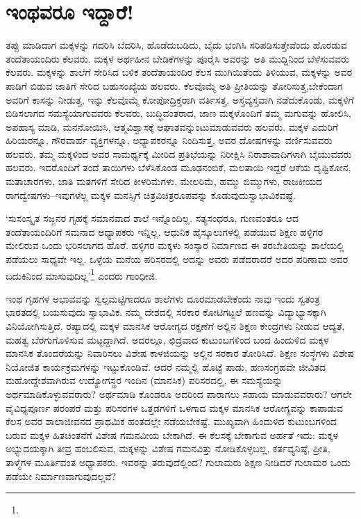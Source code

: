\section*{ಇಂಥವರೂ ಇದ್ದಾರೆ!}


ತಪ್ಪು ಮಾಡಿದಾಗ ಮಕ್ಕಳನ್ನು ಗದರಿಸಿ ಬೆದರಿಸಿ, ಹೊಡೆದುಬಡಿದು, ಬೈದು ಭಂಗಿಸಿ ಸರಿಪಡಿಸುತ್ತೇವೆಂದು ಹೊರಡುವ ತಂದೆತಾಯಂದಿರು ಕೆಲವರು. ಮಕ್ಕಳ ಅರ್ಥಹೀನ ಬೇಡಿಕೆಗಳನ್ನು ಪೂರೈಸಿ ಅವರನ್ನು ಅತಿ ಮುದ್ದಿನಿಂದ ಬೆಳೆಸುವವರು ಕೆಲವರು. ಮಕ್ಕಳನ್ನು ಶಾಲೆಗೆ ಸೇರಿಸಿದ ಬಳಿಕ ತಂದೆತಾಯಂದಿರ ಕೆಲಸ ಮುಗಿಯಿತೆಂದು ತಿಳಿಯುವ, ಮಕ್ಕಳನ್ನು ಅವರ ಪಾಡಿಗೆ ಬಿಡುವ ಜಾತಿಗೆ ಸೇರಿದ ಬಹುಸಂಖ್ಯೆಯ ಹಲವರು. ಕೆಲವೊಮ್ಮೆ ಅತಿ ಪ್ರೀತಿಯನ್ನು ತೋರಿಸುತ್ತ,\break ಬೇಕೆಂದಾಗ ಅವರಿಗೆ ಕಾಸನ್ನು ನೀಡುತ್ತ, ಇನ್ನು ಕೆಲವೊಮ್ಮೆ ಕೋಪೋದ್ರಿಕ್ತರಾಗಿ ವರ್ತಿಸತ್ತ, ಅಸ್ತವ್ಯಸ್ತವಾಗಿ ನಡೆದುಕೊಂಡು, ಮಕ್ಕಳಿಗೆ ಬಿಡಿಸಲಾಗದ ಸಮಸ್ಯೆಯಾಗುವವರು ಕೆಲವರು, ಬುದ್ಧಿವಂತರಾದ, ಜಾಣ ಮಕ್ಕಳೊಂದಿಗೆ ತಮ್ಮ ಮಗುವನ್ನು ಹೋಲಿಸಿ, ಅಪಹಾಸ್ಯ ಮಾಡಿ, ಮನನೋಯಿಸಿ, ಆತ್ಮವಿಶ್ವಾಸಕ್ಕೆ ಆಘಾತವನ್ನುಂಟುಮಾಡುವವರು ಹಲವರು. ಮಕ್ಕಳ ಎದುರಿಗೆ ಹಿರಿಯರನ್ನೂ, ಗೌರವಾರ್ಹ ವ್ಯಕ್ತಿಗಳನ್ನೂ, ಅಧ್ಯಾಪಕರನ್ನೂ ನಿಂದಿಸುತ್ತ, ಅವರ ದೋಷಗಳನ್ನು ವರ್ಣಿಸುವವರು ಹಲವರು. ತಮ್ಮ ಮಕ್ಕಳಿಂದ ಅವರ ಸಾಮರ್ಥ್ಯಕ್ಕೆ ಮೀರಿದ ಪ್ರತಿಭೆಯನ್ನು ನಿರೀಕ್ಷಿಸಿ ನಿರಾಶಾವಾದಿಗಳಾಗಿ ಬೈಯುವವರು ಹಲವರು. ಇದರೊಂದಿಗೆ ತಂದೆ ತಾಯಿಗಳು ಬೆಳೆಸಿಕೊಂಡ ಮೂಢನಂಬಿಕೆ, ಮಲತಾಯಿ ಇದ್ದರೆ ಆಕೆಯ ದೃಷ್ಟಿಕೋನ, ಮತಾಚಾರಗಳು, ಜಾತಿ ಮತಗಳಿಗೆ ಸೇರಿದ ಕೀಳರಿಮೆಗಳು, ಮೇಲರಿಮೆ, ಹಮ್ಮು ಬಿಮ್ಮುಗಳು, ರಾಜಕೀಯದ ರಾಗದ್ವೇಷಗಳು–ಇವುಗಳೆಲ್ಲ ಮಕ್ಕಳ ಮನಸ್ಸಿಗೆ ಚಿತ್ರವಿಚಿತ್ರರೂಪವನ್ನು ಕೊಡುವುದು\break ಸ್ವಾಭಾವಿಕವಷ್ಟೆ.

‘ಸುಸಂಸ್ಕೃತ ಸಜ್ಜನರ ಗೃಹಕ್ಕೆ ಸಮಾನವಾದ ಶಾಲೆ ಇನ್ನೊಂದಿಲ್ಲ. ಸತ್ಯಸಂಧರೂ, ಗುಣ\-ವಂತರೂ ಆದ ತಂದೆತಾಯಂದಿರಿಗೆ ಸಮನಾದ ಅಧ್ಯಾಪಕರು ಇನ್ನಿಲ್ಲ. ಆಧುನಿಕ ಹೈಸ್ಕೂಲುಗಳಲ್ಲಿ ಪಡೆಯುವ ಶಿಕ್ಷಣ ಹಳ್ಳಿಗರ ಮೇಲಿರುವ ಒಂದು ಭರಿಸಲಾಗದ ಹೊರೆ. ಹಳ್ಳಿಗರ ಮಕ್ಕಳು ಸಂಸ್ಕಾರ ನಿರ್ಮಾಣದ ಈ ತರಬೇತಿಯನ್ನು ಶಾಲೆಯಲ್ಲಿ ಪಡೆಯಲು ಸಾಧ್ಯವೇ ಇಲ್ಲ. ಒಳ್ಳೆಯ ಮನೆಯ ಪರಿಸರದಲ್ಲಿ ಅದನ್ನು ಅವರು ಪಡೆದರಾದರೆ ಅದರ ಪರಿಣಾಮ ಅವರ ಬದುಕಿನಿಂದ ಮಾಸುವುದಿಲ್ಲ’\footnote{} ಎಂದರು ಗಾಂಧೀಜಿ.

ಇಂಥ ಗೃಹಗಳ ಅಭಾವವನ್ನು ಸ್ವಲ್ಪಮಟ್ಟಿಗಾದರೂ ಶಾಲೆಗಳು ದೂರಮಾಡಬೇಕೆಂದು ನಾವು ಇಂದು ಸ್ವತಂತ್ರ ಭಾರತದಲ್ಲಿ ಬಯಸುವುದು ಸ್ವಾಭಾವಿಕ. ನಮ್ಮ ದೇಶದಲ್ಲಿ ಸರಕಾರ ಕೋಟಿಗಟ್ಟಲೆ ಹಣವನ್ನು ವಿದ್ಯಾಭ್ಯಾಸಕ್ಕಾಗಿ ವಿನಿಯೋಗಿಸುತ್ತಿದೆ. ರಷ್ಯಾದಲ್ಲಿ ಮಕ್ಕಳ ಮಾನಸಿಕ ಆರೋಗ್ಯದ ರಕ್ಷಣೆಗೆ ಅಲ್ಲಿನ ಶಿಕ್ಷಣ ಕೇಂದ್ರಗಳು ನೀಡುವ ಆದ್ಯತೆ, ಮಹತ್ವ ಬೆರಗುಗೊಳಿಸುವ ಮಟ್ಟದ್ದಾಗಿದೆ. ಅದರಲ್ಲೂ, ಛಿದ್ರವಾದ ಕುಟುಂಬಗಳಿಂದ ಬಂದ ಹಿಂದುಳಿದ ಮಕ್ಕಳ ಮಾನಸಿಕ ತೊಂದರೆಯನ್ನು ನಿವಾರಿಸಲು ವಿಶೇಷ ಕಾಳಜಿಯನ್ನು ಅಲ್ಲಿನ ಸರಕಾರ ತೋರಿಸಿದೆ. ಶಿಕ್ಷಣ ಸಂಸ್ಥೆಗಳು ವಿಶೇಷ ನಿಯೋಜಿತ ಕಾರ್ಯಕ್ರಮಗಳನ್ನು ಇಟ್ಟುಕೊಂಡಿವೆ. ಆದರೆ ನಮ್ಮಲ್ಲಿ ಹೊಟ್ಟೆ ಪಾಡು, ಹಣಸಂಗ್ರಹವೇ ಜೀವಿತದ ಮಹೋದ್ದೇಶವಾಗಿರುವ ಉದ್ಯೋಗಸ್ಥರ ಇಂದಿನ (ಮಾನಸಿಕ) ಪರಿಸರದಲ್ಲಿ, ಈ ಸಮಸ್ಯೆಯನ್ನು ಅರ್ಥಮಾಡಿಕೊಳ್ಳುವವರಾರು? ಅರ್ಥಮಾಡಿ ಕೊಂಡರೂ ಅದರಿಂದ ಪಾರಾಗಲು ಸಹಾಯ ಮಾಡುವವರಾರು? ಆಗಲೇ ವೈವಿಧ್ಯಪೂರ್ಣ ಪರಂಪರೆ ಮತ್ತು ಪರಿಸರಗಳ ಒತ್ತಡಗಳಿಗೆ ಒಳಗಾದ ಮಕ್ಕಳ ಮಾನಸಿಕ ಆರೋಗ್ಯವನ್ನು ಕಾಪಾಡುವ ಕೆಲಸ ಅವರ ಶಾಲಾಜೀವನದ ಪ್ರಾಥಮಿಕ ಹಂತದಲ್ಲೇ ನಡೆಯಬೇಕಷ್ಟೆ. ಮುಖ್ಯವಾಗಿ ಹಿಂದುಳಿದ ಕುಟುಂಬಗಳಿಂದ ಬರುವ ಮಕ್ಕಳ ಹಿತಚಿಂತನೆಗೆ ವಿಶೇಷ ಗಮನವೀಯ ಬೇಕಾಗಿದೆ. ಈ ಕೆಲಸಕ್ಕೆ ಬೇಕಾಗುವ ಅರ್ಹತೆ ಇದು: ಮಕ್ಕಳ ಅಭ್ಯುದಯಕ್ಕಾಗಿ ತೀವ್ರ ಹಂಬಲಿಸುವ, ಮಕ್ಕಳನ್ನು ವಿಶೇಷ ಗಮನವಿತ್ತು ನೋಡಿಕೊಳ್ಳಬಲ್ಲ, ಕರ್ತವ್ಯನಿಷ್ಠೆ, ಪ್ರೀತಿ, ತಾಳ್ಮೆಗಳ ಮೂರ್ತಿವಂತ ಅಧ್ಯಾಪಕರು. ಇವರನ್ನು ತರುವುದೆಲ್ಲಿಂದ? ಗುಲಾಮರು ಶಿಕ್ಷಣ ನೀಡಿದರೆ ಗುಲಾಮರ ಒಂದು ಪಡೆಯೇ ನಿರ್ಮಾಣವಾಗುವುದಲ್ಲವೆ?


